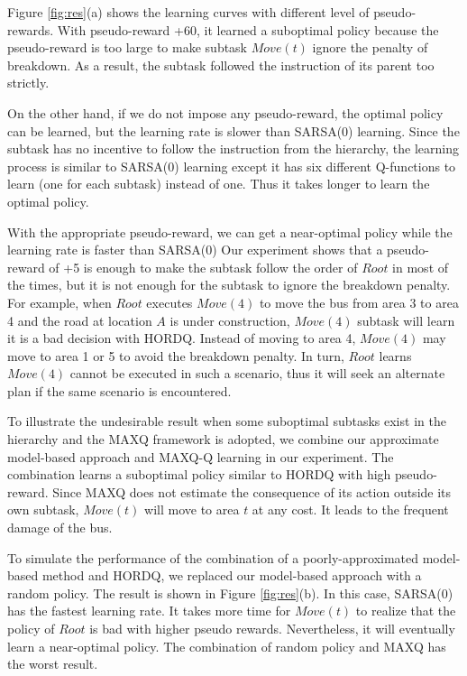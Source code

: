 Figure \ref{fig:res}(a) shows the learning curves with different level of pseudo-rewards.
With pseudo-reward +60, it learned a suboptimal policy because
the pseudo-reward is too large to make subtask $Move(t)$ ignore 
the penalty of breakdown. As a result, the subtask followed 
the instruction of its parent too strictly.

On the other hand, if we do not impose any pseudo-reward, 
the optimal policy can be learned, but the learning rate is
slower than SARSA(0) learning. Since the subtask has no
incentive to follow the instruction from the hierarchy, 
the learning process is similar to SARSA(0) learning 
except it has six different Q-functions to learn (one for each subtask) instead of one.
Thus it takes longer to learn the optimal policy. 

With the appropriate pseudo-reward, we can get a near-optimal policy
while the learning rate is faster than SARSA(0)
Our experiment shows that a pseudo-reward of +5 is enough to make the subtask follow 
the order of $Root$ in most of the times, but it is not enough for the subtask to ignore
the breakdown penalty. For example, when $Root$ executes $Move(4)$ to move the bus from area 
3 to area 4 and the road at location $A$ is under construction, $Move(4)$ subtask
will learn it is a bad decision with HORDQ.
Instead of moving to area 4, $Move(4)$ may move to area 1 or 5 to avoid
the breakdown penalty. In turn, $Root$ learns $Move(4)$ cannot be executed in 
such a scenario, thus it will seek an alternate plan if the same scenario
is encountered.

To illustrate the undesirable result when some suboptimal subtasks exist in 
the hierarchy and the MAXQ framework is adopted, we combine our approximate model-based approach
and MAXQ-Q learning in our experiment. The combination learns a suboptimal policy similar to HORDQ with high pseudo-reward. 
Since MAXQ does not estimate the consequence of its action outside its own subtask,
$Move(t)$ will move to area $t$ at any cost. It leads to the frequent damage of the bus.

To simulate the performance of the combination of a poorly-approximated model-based method and 
HORDQ, we replaced our model-based approach with a random policy.
The result is shown in Figure \ref{fig:res}(b). In this case, SARSA(0) has the fastest
learning rate. It takes more time for $Move(t)$ to realize that the policy of $Root$ is bad with higher pseudo rewards.
Nevertheless, it will eventually learn a near-optimal policy.
The combination of random policy and MAXQ has the worst result.


